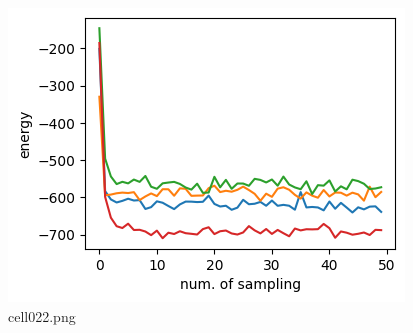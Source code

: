 \begin{figure}[ht]
	\centering
	\includegraphics[scale=0.8, max width=\linewidth]{./fig/energy-based-model/boltzmann-machine/cell022.png}
	\caption{cell022.png}
	\label{cell022.png}
\end{figure}